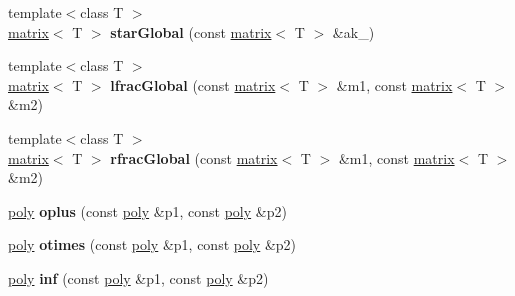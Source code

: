 \begin{DoxyCompactItemize}
\mbox{\label{namespaceetvo_i_i_a42177946b544b421933b00ee9c3e75b5}} 
{\footnotesize template$<$class T $>$ }\\\mbox{\hyperlink{classetvo_i_i_1_1matrix}{matrix}}$<$ T $>$ {\bfseries star\+Global} (const \mbox{\hyperlink{classetvo_i_i_1_1matrix}{matrix}}$<$ T $>$ \&ak\+\_)
\item 
\mbox{\label{namespaceetvo_i_i_adb722ee4d24378a8700be02a68dd4438}} 
{\footnotesize template$<$class T $>$ }\\\mbox{\hyperlink{classetvo_i_i_1_1matrix}{matrix}}$<$ T $>$ {\bfseries lfrac\+Global} (const \mbox{\hyperlink{classetvo_i_i_1_1matrix}{matrix}}$<$ T $>$ \&m1, const \mbox{\hyperlink{classetvo_i_i_1_1matrix}{matrix}}$<$ T $>$ \&m2)
\item 
\mbox{\label{namespaceetvo_i_i_a7e96b55e6b053bb22f294c2c9f800df3}} 
{\footnotesize template$<$class T $>$ }\\\mbox{\hyperlink{classetvo_i_i_1_1matrix}{matrix}}$<$ T $>$ {\bfseries rfrac\+Global} (const \mbox{\hyperlink{classetvo_i_i_1_1matrix}{matrix}}$<$ T $>$ \&m1, const \mbox{\hyperlink{classetvo_i_i_1_1matrix}{matrix}}$<$ T $>$ \&m2)
\item 
\mbox{\label{namespaceetvo_i_i_a6ce3d5b7c5cd3f151d354c8919572936}} 
\mbox{\hyperlink{classetvo_i_i_1_1poly}{poly}} {\bfseries oplus} (const \mbox{\hyperlink{classetvo_i_i_1_1poly}{poly}} \&p1, const \mbox{\hyperlink{classetvo_i_i_1_1poly}{poly}} \&p2)
\item 
\mbox{\label{namespaceetvo_i_i_a6ca8ed781277a7c232b2c91aa29298f5}} 
\mbox{\hyperlink{classetvo_i_i_1_1poly}{poly}} {\bfseries otimes} (const \mbox{\hyperlink{classetvo_i_i_1_1poly}{poly}} \&p1, const \mbox{\hyperlink{classetvo_i_i_1_1poly}{poly}} \&p2)
\item 
\mbox{\label{namespaceetvo_i_i_a54f73935e7d88cad5fb58e1362353ab8}} 
\mbox{\hyperlink{classetvo_i_i_1_1poly}{poly}} {\bfseries inf} (const \mbox{\hyperlink{classetvo_i_i_1_1poly}{poly}} \&p1, const \mbox{\hyperlink{classetvo_i_i_1_1poly}{poly}} \&p2)
\item 
\mbox{\label{namespaceetvo_i_i_aba683eb36e0764939f3680ad63a8e528}} 

\end{DoxyCompactItemize}

